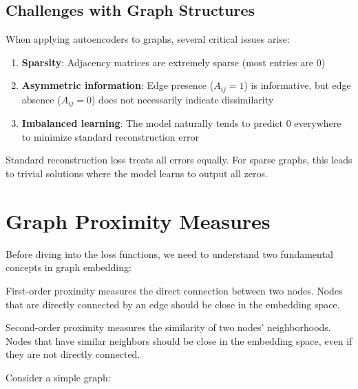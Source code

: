 \begin{notechapter}
\subsection{Challenges with Graph Structures}

When applying autoencoders to graphs, several critical issues arise:

\begin{enumerate}
    \item \textbf{Sparsity}: Adjacency matrices are extremely sparse (most entries are 0)
    \item \textbf{Asymmetric information}: Edge presence ($A_{ij} = 1$) is informative, but edge absence ($A_{ij} = 0$) does not necessarily indicate dissimilarity
    \item \textbf{Imbalanced learning}: The model naturally tends to predict 0 everywhere to minimize standard reconstruction error
\end{enumerate}

\begin{tcolorbox}[colback=blue!5!white,colframe=blue!75!black,title=Key Insight]
Standard reconstruction loss treats all errors equally. For sparse graphs, this leads to trivial solutions where the model learns to output all zeros.
\end{tcolorbox}

\section{Graph Proximity Measures}

Before diving into the loss functions, we need to understand two fundamental concepts in graph embedding:

\begin{definition}
First-order proximity measures the direct connection between two nodes. Nodes that are directly connected by an edge should be close in the embedding space.
\end{definition}

\begin{definition}
Second-order proximity measures the similarity of two nodes' neighborhoods. Nodes that have similar neighbors should be close in the embedding space, even if they are not directly connected.
\end{definition}

\begin{example}
Consider a simple graph:
\begin{center}
\end{center}
\end{example}
\end{notechapter}
